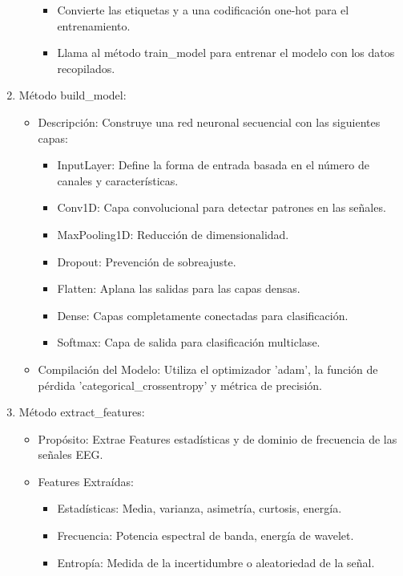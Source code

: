 \documentclass{article}
\begin{document}
\begin{enumerate}
\begin{itemize}
\begin{itemize}
            \item Convierte las etiquetas y a una codificación one-hot para el entrenamiento.
           \item Llama al método train\_model para entrenar el modelo con los datos recopilados.
        \end{itemize}
    \end{itemize}
    \item Método build\_model:
    \begin{itemize}
        \item Descripción: Construye una red neuronal secuencial con las siguientes capas:
        \begin{itemize}
            \item InputLayer: Define la forma de entrada basada en el número de canales y características.
            \item Conv1D: Capa convolucional para detectar patrones en las señales.
            \item MaxPooling1D: Reducción de dimensionalidad.
            \item Dropout: Prevención de sobreajuste.
            \item Flatten: Aplana las salidas para las capas densas.
            \item Dense: Capas completamente conectadas para clasificación.
            \item Softmax: Capa de salida para clasificación multiclase.
        \end{itemize}
        \item Compilación del Modelo: Utiliza el optimizador 'adam', la función de pérdida 'categorical\_crossentropy' y métrica de precisión.
    \end{itemize}
    \item Método extract\_features:
    \begin{itemize}
        \item Propósito: Extrae Features estadísticas y de dominio de frecuencia de las señales EEG.
        \item Features Extraídas:
        \begin{itemize}
            \item Estadísticas: Media, varianza, asimetría, curtosis, energía.
            \item Frecuencia: Potencia espectral de banda, energía de wavelet.
            \item Entropía: Medida de la incertidumbre o aleatoriedad de la señal.

\end{itemize}
\end{itemize}
\end{enumerate}
\end{document}
